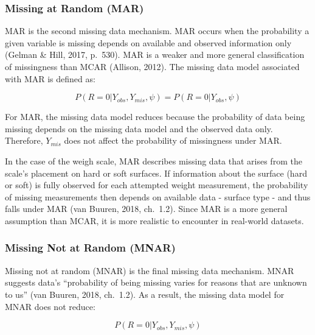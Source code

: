 \documentclass[12pt,oneside]{chicagocapstone}
\begin{document}
\subsubsection*{Missing at Random (MAR)}\label{mar}

MAR is the second missing data mechanism. MAR occurs when the
probability a given variable is missing depends on available and
observed information only (Gelman \& Hill, 2017, p.~530). MAR is a
weaker and more general classification of missingness than MCAR
(Allison, 2012). The missing data model associated with MAR is defined
as:

\[P(R=0|Y_{obs},Y_{mis},\psi) = P(R=0|Y_{obs},\psi)\]

For MAR, the missing data model reduces because the probability of data
being missing depends on the missing data model and the observed data
only. Therefore, \(Y_{mis}\) does not affect the probability of
missingness under MAR.

In the case of the weigh scale, MAR describes missing data that arises
from the scale's placement on hard or soft surfaces. If information
about the surface (hard or soft) is fully observed for each attempted
weight measurement, the probability of missing measurements then depends
on available data - surface type - and thus falls under MAR (van Buuren,
2018, ch.~1.2). Since MAR is a more general assumption than MCAR, it is
more realistic to encounter in real-world datasets.

\subsubsection*{Missing Not at Random (MNAR)}\label{mnar}

Missing not at random (MNAR) is the final missing data mechanism. MNAR
suggests data's ``probability of being missing varies for reasons that
are unknown to us'' (van Buuren, 2018, ch.~1.2). As a result, the
missing data model for MNAR does not reduce:

\[P(R=0|Y_{obs},Y_{mis},\psi)\]
\end{document}
